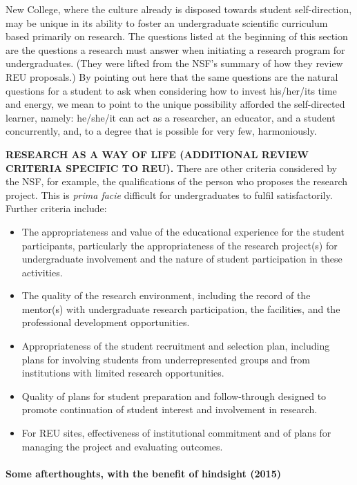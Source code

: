 New College, where the culture already is disposed towards student
self-direction, may be unique in its ability to foster an undergraduate
scientific curriculum based primarily on research. The questions listed
at the beginning of this section are the questions a research must
answer when initiating a research program for undergraduates. (They were
lifted from the NSF's summary of how they review REU proposals.) By
pointing out here that the same questions are the natural questions for
a student to ask when considering how to invest his/her/its time and
energy, we mean to point to the unique possibility afforded the
self-directed learner, namely: he/she/it can act as a researcher, an
educator, and a student concurrently, and, to a degree that is possible
for very few, harmoniously.

\textbf{RESEARCH AS A WAY OF LIFE (ADDITIONAL REVIEW CRITERIA SPECIFIC
TO REU).} There are other criteria considered by the NSF, for example,
the qualifications of the person who proposes the research project. This
is \emph{prima facie} difficult for undergraduates to fulfil
satisfactorily. Further criteria include:

\begin{itemize}
\itemsep1pt\parskip0pt
\item
  The appropriateness and value of the educational experience for the
  student participants, particularly the appropriateness of the research
  project(s) for undergraduate involvement and the nature of student
  participation in these activities.
\item
  The quality of the research environment, including the record of the
  mentor(s) with undergraduate research participation, the facilities,
  and the professional development opportunities.
\item
  Appropriateness of the student recruitment and selection plan,
  including plans for involving students from underrepresented groups
  and from institutions with limited research opportunities.
\item
  Quality of plans for student preparation and follow-through designed
  to promote continuation of student interest and involvement in
  research.
\item
  For REU sites, effectiveness of institutional commitment and of plans
  for managing the project and evaluating outcomes.
\end{itemize}

\paragraph{Some afterthoughts, with the benefit of hindsight
(2015)}\label{some-afterthoughts-with-the-benefit-of-hindsight-2015}


